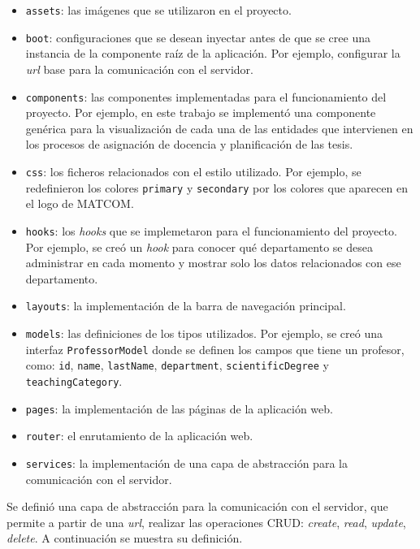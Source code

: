 \begin{itemize}
    \item \texttt{assets}: las imágenes que se utilizaron en el proyecto.
    \item \texttt{boot}: configuraciones que se desean inyectar antes de que se cree una instancia de la componente 
    raíz de la aplicación. Por ejemplo, configurar la \textit{url} base para la comunicación con el servidor. 
    \item \texttt{components}: las componentes implementadas para el funcionamiento del proyecto. 
    Por ejemplo, en este trabajo se implementó una componente genérica para la visualización de cada una de las entidades 
    que intervienen en los procesos de asignación de docencia y planificación de las tesis.  
    \item \texttt{css}: los ficheros relacionados con el estilo utilizado. Por ejemplo, se redefinieron los colores 
    \texttt{primary} y \texttt{secondary} por los colores que aparecen en el logo de MATCOM. 
    \item \texttt{hooks}: los \textit{hooks} que se implemetaron para el funcionamiento del proyecto.
    Por ejemplo, se creó un \textit{hook} para conocer qué departamento se desea administrar en cada momento 
    y mostrar solo los datos relacionados con ese departamento.
    \item \texttt{layouts}: la implementación de la barra de navegación principal.
    \item \texttt{models}: las definiciones de los tipos utilizados. Por ejemplo, se creó una interfaz \texttt{ProfessorModel} donde se definen los 
    campos que tiene un profesor, como: \texttt{id}, \texttt{name}, \texttt{lastName}, \texttt{department}, \texttt{scientificDegree} y \texttt{teachingCategory}.  
    \item \texttt{pages}: la implementación de las páginas de la aplicación web.
    \item \texttt{router}: el enrutamiento de la aplicación web.
    \item \texttt{services}: la implementación de una capa de abstracción para la comunicación con el servidor.
\end{itemize}


Se definió una capa de abstracción para la comunicación con 
el servidor, que permite a partir de una \textit{url}, realizar las operaciones CRUD: \textit{create}, \textit{read}, \textit{update}, \textit{delete}. 
A continuación se muestra su definición.

